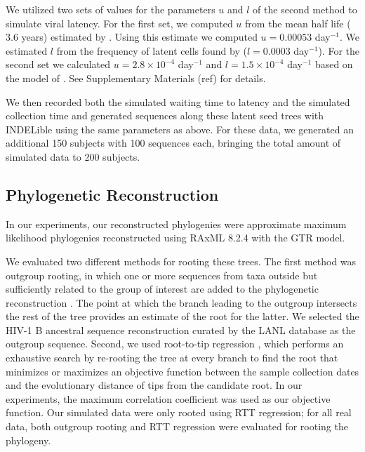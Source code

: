 \documentclass[12pt]{article}
\begin{document}
We utilized two sets of values for the parameters $u$ and $l$ of the second method to simulate viral latency.
For the first set, we computed $u$ from the mean half life ($3.6$ years) estimated by \cite{Crooks15}.
Using this estimate we computed $u = 0.00053$ day$^{-1}$.
We estimated $l$ from the frequency of latent cells found by \cite{Ho13} ($l=0.0003$ day$^{-1}$).
For the second set we calculated $u = 2.8 \times 10^{-4}$ day$^{-1}$ and $l = 1.5 \times 10^{-4}$ day$^{-1}$ based on the model of \cite{Kim06}.
See Supplementary Materials (ref) for details.


We then recorded both the simulated waiting time to latency and the simulated collection time and generated sequences along these latent seed trees with INDELible using the same parameters as above. 
For these data, we generated an additional 150 subjects with 100 sequences each, bringing the total amount of simulated data to 200 subjects.

\subsection * {Phylogenetic Reconstruction} \label{subsec:phylo}
In our experiments, our reconstructed phylogenies were approximate maximum likelihood phylogenies reconstructed using RAxML 8.2.4 \citep{Raxml14} with the GTR model.

We evaluated two different methods for rooting these trees. 
The first method was outgroup rooting, in which one or more sequences from taxa outside but sufficiently related to the group of interest are added to the phylogenetic reconstruction \citep{Huelsenbeck02}.
The point at which the branch leading to the outgroup intersects the rest of the tree provides an estimate of the root for the latter.
We selected the HIV-1 B ancestral sequence reconstruction curated by the LANL database \citep{LosAlamos} as the outgroup sequence.
Second, we used root-to-tip regression \citep[RTT;][]{Korber00}, which performs an exhaustive search by re-rooting the tree at every branch to find the root that minimizes or maximizes an objective function between the sample collection dates and the evolutionary distance of tips from the candidate root.
In our experiments, the maximum correlation coefficient was used as our objective function.
Our simulated data were only rooted using RTT regression; for all real data, both outgroup rooting and RTT regression were evaluated for rooting the phylogeny.
\end{document}
